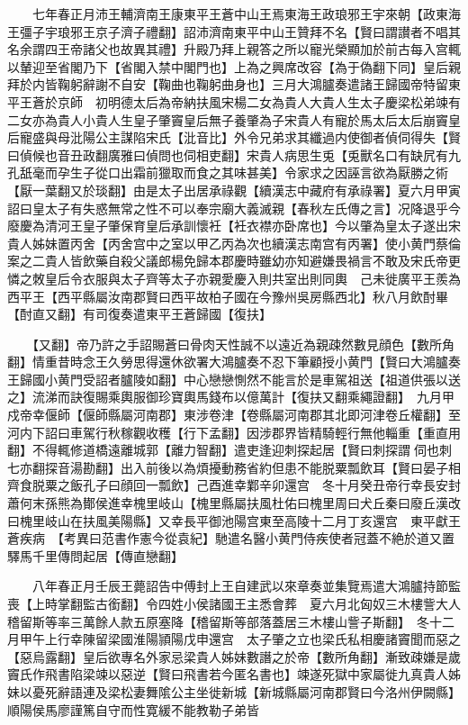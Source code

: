 　　七年春正月沛王輔濟南王康東平王蒼中山王焉東海王政琅邪王宇來朝【政東海王彊子宇琅邪王京子濟子禮翻】詔沛濟南東平中山王贊拜不名【賢曰謂讃者不唱其名余謂四王帝諸父也故異其禮】升殿乃拜上親答之所以寵光榮顯加於前古每入宫輒以輦迎至省閣乃下【省閣入禁中閣門也】上為之興席改容【為于偽翻下同】皇后親拜於内皆鞠躬辭謝不自安【鞠曲也鞠躬曲身也】三月大鴻臚奏遣諸王歸國帝特留東平王蒼於京師　初明德太后為帝納扶風宋楊二女為貴人大貴人生太子慶梁松弟竦有二女亦為貴人小貴人生皇子肇竇皇后無子養肇為子宋貴人有寵於馬太后太后崩竇皇后寵盛與母沘陽公主謀陷宋氏【沘音比】外令兄弟求其纖過内使御者偵伺得失【賢曰偵候也音丑政翻廣雅曰偵問也伺相吏翻】宋貴人病思生兎【兎獸名口有缺凥有九孔舐毫而孕生子從口出霜前獵取而食之其味甚美】令家求之因誣言欲為厭勝之術【厭一葉翻又於琰翻】由是太子出居承祿觀【續漢志中藏府有承祿署】夏六月甲寅詔曰皇太子有失惑無常之性不可以奉宗廟大義滅親【春秋左氏傳之言】况降退乎今廢慶為清河王皇子肇保育皇后承訓懷衽【衽衣襟亦卧席也】今以肇為皇太子遂出宋貴人姊妹置丙舍【丙舍宫中之室以甲乙丙為次也續漢志南宫有丙署】使小黄門蔡倫案之二貴人皆飲藥自殺父議郎楊免歸本郡慶時雖幼亦知避嫌畏禍言不敢及宋氏帝更憐之敇皇后令衣服與太子齊等太子亦親愛慶入則共室出則同輿　己未徙廣平王羨為西平王【西平縣屬汝南郡賢曰西平故柏子國在今豫州吳房縣西北】秋八月飲酎畢【酎直又翻】有司復奏遣東平王蒼歸國【復扶】

　　【又翻】帝乃許之手詔賜蒼曰骨肉天性誠不以遠近為親疎然數見顔色【數所角翻】情重昔時念王久勞思得還休欲署大鴻臚奏不忍下筆顧授小黄門【賢曰大鴻臚奏王歸國小黄門受詔者臚陵如翻】中心戀戀惻然不能言於是車駕祖送【祖道供張以送之】流涕而訣復賜乘輿服御珍寶輿馬錢布以億萬計【復扶又翻乘繩證翻】　九月甲戍帝幸偃師【偃師縣屬河南郡】東涉卷津【卷縣屬河南郡其北即河津卷丘權翻】至河内下詔曰車駕行秋稼觀收穫【行下孟翻】因涉郡界皆精騎輕行無他輜重【重直用翻】不得輒修道橋遠離城郭【離力智翻】遣吏逢迎刺探起居【賢曰刺探謂伺也刺七亦翻探音湯勘翻】出入前後以為煩擾動務省約但患不能脱粟瓢飲耳【賢曰晏子相齊食脱粟之飯孔子曰顔回一瓢飲】己酉進幸鄴辛卯還宫　冬十月癸丑帝行幸長安封蕭何末孫熊為鄼侯進幸槐里岐山【槐里縣屬扶風杜佑曰槐里周曰犬丘秦曰廢丘漢改曰槐里岐山在扶風美陽縣】又幸長平御池陽宫東至高陵十二月丁亥還宫　東平獻王蒼疾病　【考異曰范書作憲今從袁紀】馳遣名醫小黄門侍疾使者冠蓋不絶於道又置驛馬千里傳問起居【傳直戀翻】

　　八年春正月壬辰王薨詔告中傅封上王自建武以來章奏並集覽焉遣大鴻臚持節監喪【上時掌翻監古銜翻】令四姓小侯諸國王主悉會葬　夏六月北匈奴三木樓訾大人稽留斯等率三萬餘人款五原塞降【稽留斯等部落蓋居三木樓山訾子斯翻】　冬十二月甲午上行幸陳留梁國淮陽頴陽戊申還宫　太子肇之立也梁氏私相慶諸竇聞而惡之【惡烏露翻】皇后欲專名外家忌梁貴人姊妹數譖之於帝【數所角翻】漸致疎嫌是歲竇氏作飛書陷梁竦以惡逆【賢曰飛書若今匿名書也】竦遂死獄中家屬徙九真貴人姊妹以憂死辭語連及梁松妻舞隂公主坐徙新城【新城縣屬河南郡賢曰今洛州伊闕縣】順陽侯馬廖謹篤自守而性寛緩不能教勒子弟皆

